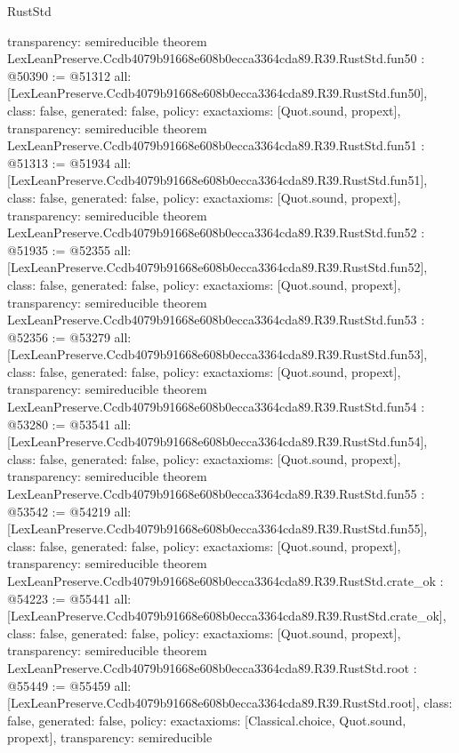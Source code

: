 \begin{lexlean}{RustStd}
\begin{coremodule}
{  transparency: semireducible
}
theorem LexLeanPreserve.Ccdb4079b91668e608b0ecca3364cda89.R39.RustStd.fun50 : @50390 := @51312 {
  all: [LexLeanPreserve.Ccdb4079b91668e608b0ecca3364cda89.R39.RustStd.fun50],
  class: false,
  generated: false,
  policy: exact{axioms: [Quot.sound, propext]},
  transparency: semireducible
}
theorem LexLeanPreserve.Ccdb4079b91668e608b0ecca3364cda89.R39.RustStd.fun51 : @51313 := @51934 {
  all: [LexLeanPreserve.Ccdb4079b91668e608b0ecca3364cda89.R39.RustStd.fun51],
  class: false,
  generated: false,
  policy: exact{axioms: [Quot.sound, propext]},
  transparency: semireducible
}
theorem LexLeanPreserve.Ccdb4079b91668e608b0ecca3364cda89.R39.RustStd.fun52 : @51935 := @52355 {
  all: [LexLeanPreserve.Ccdb4079b91668e608b0ecca3364cda89.R39.RustStd.fun52],
  class: false,
  generated: false,
  policy: exact{axioms: [Quot.sound, propext]},
  transparency: semireducible
}
theorem LexLeanPreserve.Ccdb4079b91668e608b0ecca3364cda89.R39.RustStd.fun53 : @52356 := @53279 {
  all: [LexLeanPreserve.Ccdb4079b91668e608b0ecca3364cda89.R39.RustStd.fun53],
  class: false,
  generated: false,
  policy: exact{axioms: [Quot.sound, propext]},
  transparency: semireducible
}
theorem LexLeanPreserve.Ccdb4079b91668e608b0ecca3364cda89.R39.RustStd.fun54 : @53280 := @53541 {
  all: [LexLeanPreserve.Ccdb4079b91668e608b0ecca3364cda89.R39.RustStd.fun54],
  class: false,
  generated: false,
  policy: exact{axioms: [Quot.sound, propext]},
  transparency: semireducible
}
theorem LexLeanPreserve.Ccdb4079b91668e608b0ecca3364cda89.R39.RustStd.fun55 : @53542 := @54219 {
  all: [LexLeanPreserve.Ccdb4079b91668e608b0ecca3364cda89.R39.RustStd.fun55],
  class: false,
  generated: false,
  policy: exact{axioms: [Quot.sound, propext]},
  transparency: semireducible
}
theorem LexLeanPreserve.Ccdb4079b91668e608b0ecca3364cda89.R39.RustStd.crate_ok : @54223 := @55441 {
  all: [LexLeanPreserve.Ccdb4079b91668e608b0ecca3364cda89.R39.RustStd.crate_ok],
  class: false,
  generated: false,
  policy: exact{axioms: [Quot.sound, propext]},
  transparency: semireducible
}
theorem LexLeanPreserve.Ccdb4079b91668e608b0ecca3364cda89.R39.RustStd.root : @55449 := @55459 {
  all: [LexLeanPreserve.Ccdb4079b91668e608b0ecca3364cda89.R39.RustStd.root],
  class: false,
  generated: false,
  policy: exact{axioms: [Classical.choice, Quot.sound, propext]},
  transparency: semireducible
}


\end{coremodule}
\end{lexlean}
